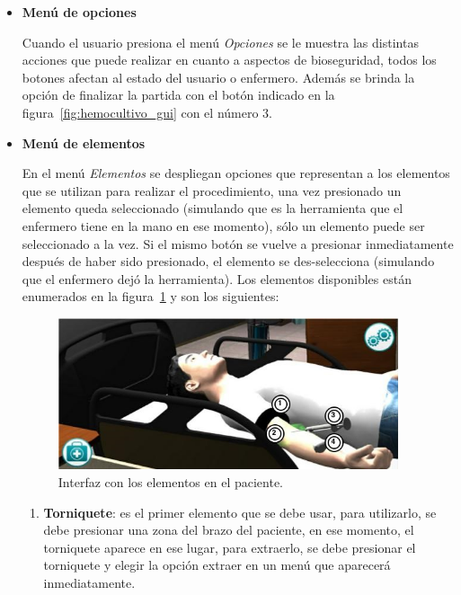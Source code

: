\begin{itemize}
\item \textbf{Menú de opciones}

Cuando el usuario presiona el menú \emph{Opciones} se le muestra las distintas acciones que puede
realizar en cuanto a aspectos de bioseguridad, todos los botones
afectan al estado del usuario o enfermero. %
Además se brinda la opción de finalizar la partida con el botón
indicado en la figura~\ref{fig:hemocultivo_gui} con el número $3$.

\item \textbf{Menú de elementos}

En el menú \emph{Elementos} se despliegan opciones que representan a los
elementos que se utilizan para realizar el procedimiento, una vez presionado un
elemento queda seleccionado (simulando que es la herramienta que el enfermero
tiene en la mano en ese momento), sólo un elemento puede ser seleccionado a la
vez. Si el mismo botón se vuelve a presionar inmediatamente después de haber
sido presionado, el elemento se des-selecciona (simulando que el enfermero dejó
la herramienta). Los elementos disponibles están enumerados en la
figura~\ref{fig:hemocultivo_elementos} y son los siguientes:


\begin{figure}[H]
\centering
\includegraphics[width=10cm]{solucion/images/hemocultivo_elementos.jpg}
\caption{Interfaz con los elementos en el paciente.}
\label{fig:hemocultivo_elementos}
\end{figure}


\begin{enumerate} 
    
\item \textbf{Torniquete}: es el primer elemento que se debe usar, para
    utilizarlo, se debe presionar una zona del brazo del paciente, en ese
    momento, el torniquete aparece en ese lugar, para extraerlo, se debe
    presionar el torniquete y elegir la opción extraer en un menú que aparecerá
    inmediatamente.


\end{enumerate}
\end{itemize}
